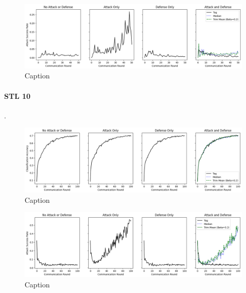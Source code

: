 \documentclass{article} %
\begin{document}
\begin{figure}[H]
    \centering
    \includegraphics[width=\textwidth]{cifar_100/classic/tag/centralized/alpha10000--alpha_val10000/visuals/pois_accuracy--n_malicious1--beta0.2.png}
    \caption{Caption}
    \label{fig:my_label}
\end{figure}


%
\paragraph{STL 10}.

\begin{figure}[H]
    \centering
    \includegraphics[width=\textwidth]{stl_10/classic/tag/centralized/alpha10000--alpha_val10000/visuals/clean_accuracy--n_malicious1--beta0.2.png}
    \caption{Caption}
    \label{fig:my_label}
\end{figure}

\begin{figure}[H]
    \centering
    \includegraphics[width=\textwidth]{stl_10/classic/tag/centralized/alpha10000--alpha_val10000/visuals/pois_accuracy--n_malicious1--beta0.2.png}
    \caption{Caption}
    \label{fig:my_label}
\end{figure}
\end{document}
